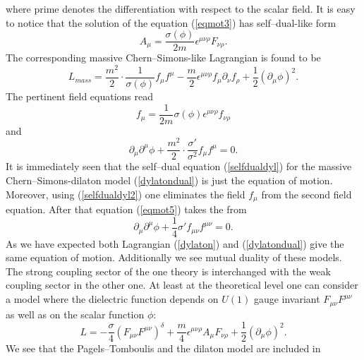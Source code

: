 \documentclass[a4 paper, 12 pt] {article}
\begin{document}
where prime denotes the differentiation with respect to the scalar field.
It is easy to notice that the solution of the equation (\ref{eqmot3}) has
self--dual-like form
\begin{equation}
A_{\mu }= \frac{\sigma (\phi ) }{2m} \epsilon^{\mu \nu \rho} F_{\nu \rho
}.
\label{selfdualdyl}
\end{equation}
The corresponding massive Chern--Simons-like Lagrangian is found to be
\begin{equation}
L_{mass} =\frac{m^2}{2} \cdot \frac{1}{\sigma (\phi )} f_{\mu } f^{\mu }
-\frac{m}{2} \epsilon^{\mu \nu \rho } f_{\mu } \partial_{\nu } f_{\rho}
+\frac{1}{2} (\partial_{\mu } \phi )^2.
\label{dylatondual}
\end{equation}
The pertinent field equations read
\begin{equation}
f_{\mu } = \frac{1}{2 m } \sigma (\phi ) \epsilon^{\mu \nu \rho } f_{\nu
\rho }
\label{selfdualdyl2}
\end{equation}
and
\begin{equation}
\partial_{\mu } \partial^{\mu } \phi + \frac{m^2}{2} \cdot
\frac{\sigma'}{\sigma^2} f_{\mu } f^{\mu }=0.
\label{eqmot5}
\end{equation}
It is immediately seen that the self--dual equation (\ref{selfdualdyl})
for the massive Chern--Simons-dilaton model (\ref{dylatondual}) is just the
equation of motion. Moreover, using (\ref{selfdualdyl2}) one eliminates the
field $f_{\mu }$ from the second field equation. After that equation
(\ref{eqmot5}) takes the from
\begin{equation}
\partial_{\mu } \partial^{\mu } \phi +\frac{1}{4} \sigma' f_{\mu \nu } f^{\mu \nu
}=0.
\label{eqmot6}
\end{equation}
As we have expected both Lagrangian (\ref{dylaton}) and
(\ref{dylatondual}) give the same equation of motion. Additionally we see
mutual duality of these models. The strong coupling sector of the one
theory is interchanged with the weak coupling sector in the other one.
\newline
At least at the theoretical level one can consider a model where the
dielectric function depends on $U(1)$ gauge invariant $F_{\mu \nu }F^{\mu
\nu }$ as well as on the scalar function $\phi $:
\begin{equation}
L= -\frac{\sigma}{4} (F_{\mu \nu }F^{\mu \nu } )^{\delta} +\frac{m}{4}
\epsilon^{\mu \nu \rho } A_{\mu } F_{\nu \rho } +\frac{1}{2} (\partial_{\mu } \phi
)^2.
\label{massivedyl}
\end{equation}
We see that the Pagels--Tomboulis and the dilaton model are included in
\end{document}
